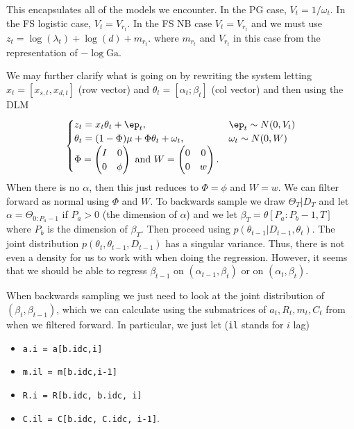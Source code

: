 \documentclass{article}
\newcommand{\Ga}{\text{Ga}}
\begin{document}
This encapsulates all of the models we encounter.  In the PG case, $V_t =
1/\omega_t$.  In the FS logistic case, $V_t = V_{r_t}$.  In the FS NB case $V_t
= V_{r_t}$ and we must use $z_t = \log(\lambda_t) + \log(d) + m_{r_t}$. where
$m_{r_t}$ and $V_{r_t}$ in this case from the representation of $-\log \Ga$.

We may further clarify what is going on by rewriting the system letting $x_t =
[x_{s,t}, x_{d,t}]$ (row vector) and $\theta_t = [\alpha_t; \beta_t]$ (col
vector) and then using the DLM
\[
\begin{cases}
z_t = x_t \theta_t + \ep_t, & \ep_t \sim N(0, V_t) \\
\theta_t = (1-\Phi) \mu + \Phi \theta_t + \omega_t, & \omega_t \sim N(0, W) \\
\Phi = 
\begin{pmatrix}
I & 0 \\
0 & \phi
\end{pmatrix}
\text{ and }
W = 
\begin{pmatrix}
0 & 0 \\
0 & w
\end{pmatrix}.
\end{cases}
\]
When there is no $\alpha$, then this just reduces to $\Phi = \phi$ and $W = w$.
We can filter forward as normal using $\Phi$ and $W$.  To backwards sample we
draw $\Theta_T | D_T$ and let $\alpha = \Theta_{0:P_a-1}$ if $P_a > 0$ (the
dimension of $\alpha$) and we let $\beta_T = \theta[P_a:P_b-1,T]$ where $P_b$ is
the dimension of $\beta_T$.  Then proceed using $p(\theta_{t-1} | D_{t-1},
\theta_t)$.  The joint distribution $p(\theta_t, \theta_{t-1}, D_{t-1})$ has a
singular variance.  Thus, there is not even a density for us to work with when
doing the regression.  However, it seems that we should be able to regress
$\beta_{t-1}$ on $(\alpha_{t-1}, \beta_t)$ or on $(\alpha_t, \beta_t)$.



When backwards
sampling we just need to look at the joint distribution of $(\beta_t,
\beta_{t-1})$, which we can calculate using the submatrices of $a_t, R_t, m_t,
C_t$ from when we filtered forward.  In particular, we just let (\texttt{il}
stands for $i$ lag)
\begin{itemize}
\item \texttt{a.i  = a[b.idc,i]}
\item \texttt{m.il = m[b.idc,i-1]}
\item \texttt{R.i  = R[b.idc, b.idc, i]}
\item \texttt{C.il = C[b.idc, C.idc, i-1]}.
\end{itemize}
\end{document}

